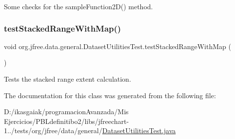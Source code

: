 Some checks for the sample\+Function2\+D() method. \mbox{\label{classorg_1_1jfree_1_1data_1_1general_1_1_dataset_utilities_test_aba00990442605d22d713bb80cd42732e}} 
\subsubsection{\texorpdfstring{test\+Stacked\+Range\+With\+Map()}{testStackedRangeWithMap()}}
{\footnotesize\ttfamily void org.\+jfree.\+data.\+general.\+Dataset\+Utilities\+Test.\+test\+Stacked\+Range\+With\+Map (\begin{DoxyParamCaption}{ }\end{DoxyParamCaption})}

Tests the stacked range extent calculation. 

The documentation for this class was generated from the following file\+:\begin{DoxyCompactItemize}
\item 
D\+:/ikasgaiak/programacion\+Avanzada/\+Mis Ejercicios/\+P\+B\+Ldefinitibo2/libs/jfreechart-\/1../tests/org/jfree/data/general/\mbox{\hyperlink{_dataset_utilities_test_8java}{Dataset\+Utilities\+Test.\+java}}\end{DoxyCompactItemize}
